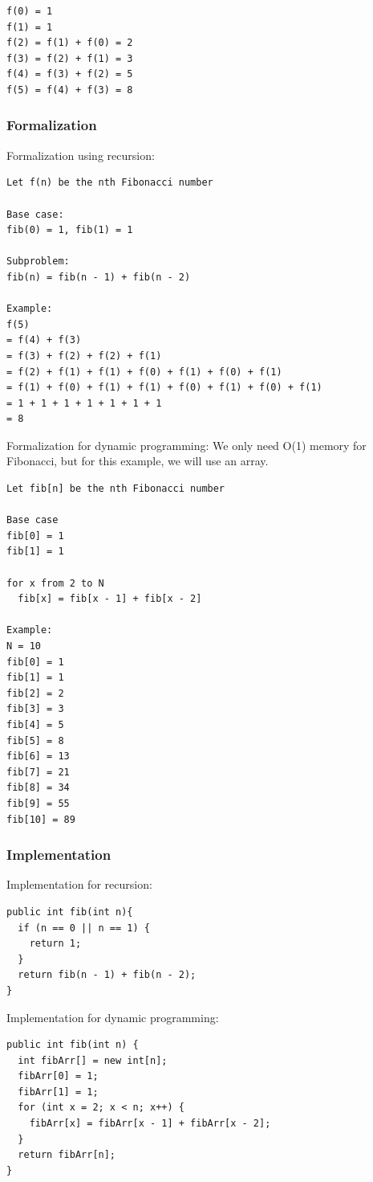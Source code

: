 \documentclass[11pt,oneside]{book}
\begin{document}
\begin{lstlisting}
f(0) = 1
f(1) = 1
f(2) = f(1) + f(0) = 2
f(3) = f(2) + f(1) = 3
f(4) = f(3) + f(2) = 5
f(5) = f(4) + f(3) = 8
\end{lstlisting}

\subsubsection{Formalization}

Formalization using recursion:

\begin{lstlisting}
Let f(n) be the nth Fibonacci number

Base case:
fib(0) = 1, fib(1) = 1

Subproblem:
fib(n) = fib(n - 1) + fib(n - 2)

Example:
f(5) 
= f(4) + f(3) 
= f(3) + f(2) + f(2) + f(1) 
= f(2) + f(1) + f(1) + f(0) + f(1) + f(0) + f(1) 
= f(1) + f(0) + f(1) + f(1) + f(0) + f(1) + f(0) + f(1) 
= 1 + 1 + 1 + 1 + 1 + 1 + 1
= 8
\end{lstlisting}

Formalization for dynamic programming:
We only need O(1) memory for Fibonacci, but for this example, we will use an array.

\begin{lstlisting}
Let fib[n] be the nth Fibonacci number

Base case
fib[0] = 1
fib[1] = 1

for x from 2 to N
  fib[x] = fib[x - 1] + fib[x - 2]

Example:
N = 10
fib[0] = 1
fib[1] = 1
fib[2] = 2
fib[3] = 3
fib[4] = 5
fib[5] = 8
fib[6] = 13
fib[7] = 21
fib[8] = 34
fib[9] = 55
fib[10] = 89
\end{lstlisting}

\subsubsection{Implementation}

Implementation for recursion:

\begin{lstlisting}
public int fib(int n){
  if (n == 0 || n == 1) {
    return 1;
  }
  return fib(n - 1) + fib(n - 2);
}
\end{lstlisting}

Implementation  for dynamic programming:

\begin{lstlisting}
public int fib(int n) {
  int fibArr[] = new int[n];
  fibArr[0] = 1;
  fibArr[1] = 1;
  for (int x = 2; x < n; x++) {
    fibArr[x] = fibArr[x - 1] + fibArr[x - 2];
  }
  return fibArr[n];
}
\end{lstlisting}
\end{document}
